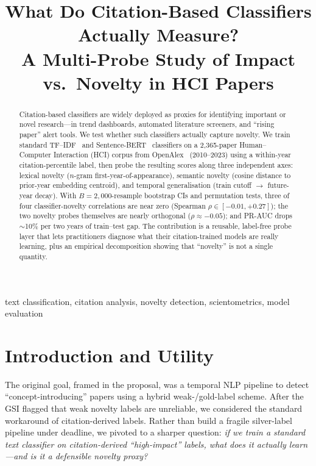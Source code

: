 \documentclass[conference]{IEEEtran}
\begin{document}
\title{What Do Citation-Based Classifiers Actually Measure?\\
A Multi-Probe Study of Impact vs.\ Novelty in HCI Papers}

\author{
}

\maketitle

\begin{abstract}
Citation-based classifiers are widely deployed as proxies for identifying important or novel research---in trend dashboards, automated literature screeners, and ``rising paper'' alert tools. We test whether such classifiers actually capture novelty. We train standard TF--IDF~\cite{salton1988tfidf} and Sentence-BERT~\cite{reimers2019sbert} classifiers on a 2{,}365-paper Human--Computer Interaction (HCI) corpus from OpenAlex~\cite{priem2022openalex} (2010--2023) using a within-year citation-percentile label, then probe the resulting scores along three independent axes: lexical novelty ($n$-gram first-year-of-appearance), semantic novelty (cosine distance to prior-year embedding centroid), and temporal generalisation (train cutoff $\to$ future-year decay). With $B=2{,}000$-resample bootstrap CIs and permutation tests, three of four classifier-novelty correlations are near zero (Spearman $\rho \in [-0.01,+0.27]$); the two novelty probes themselves are nearly orthogonal ($\rho \approx -0.05$); and PR-AUC drops $\sim$10\% per two years of train--test gap. The contribution is a reusable, label-free probe layer that lets practitioners diagnose what their citation-trained models are really learning, plus an empirical decomposition showing that ``novelty'' is not a single quantity.
\end{abstract}

\begin{IEEEkeywords}
text classification, citation analysis, novelty detection, scientometrics, model evaluation
\end{IEEEkeywords}

\section{Introduction and Utility}
The original goal, framed in the proposal, was a temporal NLP pipeline to detect ``concept-introducing'' papers using a hybrid weak-/gold-label scheme. After the GSI flagged that weak novelty labels are unreliable, we considered the standard workaround of citation-derived labels. Rather than build a fragile silver-label pipeline under deadline, we pivoted to a sharper question: \emph{if we train a standard text classifier on citation-derived ``high-impact'' labels, what does it actually learn---and is it a defensible novelty proxy?}
\end{document}
